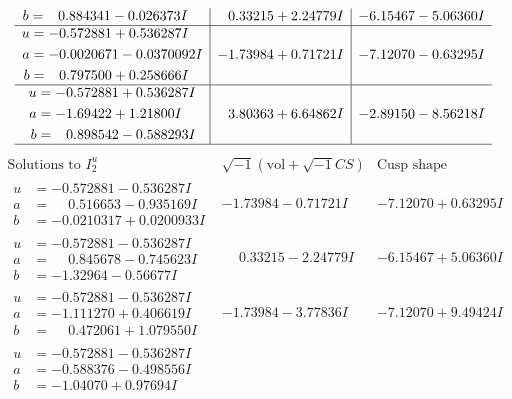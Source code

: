 \documentclass[1p]{elsarticle_modified}
\theoremstyle{definition}
\newcommand{\I}{\sqrt{-1}}
\begin{document}
$$\begin{array}{c|c|c}
\begin{aligned}
b &= \phantom{-}0.884341 - 0.026373 I\end{aligned}
 & \phantom{-}0.33215 + 2.24779 I & -6.15467 - 5.06360 I \\ \hline\begin{aligned}
u &= -0.572881 + 0.536287 I \\
a &= -0.0020671 - 0.0370092 I \\
b &= \phantom{-}0.797500 + 0.258666 I\end{aligned}
 & -1.73984 + 0.71721 I & -7.12070 - 0.63295 I \\ \hline\begin{aligned}
u &= -0.572881 + 0.536287 I \\
a &= -1.69422 + 1.21800 I \\
b &= \phantom{-}0.898542 - 0.588293 I\end{aligned}
 & \phantom{-}3.80363 + 6.64862 I & -2.89150 - 8.56218 I\\
 \hline 
 \end{array}$$\newpage$$\begin{array}{c|c|c}  
\text{Solutions to }I^u_{2}& \I (\text{vol} + \sqrt{-1}CS) & \text{Cusp shape}\\
 \hline 
\begin{aligned}
u &= -0.572881 - 0.536287 I \\
a &= \phantom{-}0.516653 - 0.935169 I \\
b &= -0.0210317 + 0.0200933 I\end{aligned}
 & -1.73984 - 0.71721 I & -7.12070 + 0.63295 I \\ \hline\begin{aligned}
u &= -0.572881 - 0.536287 I \\
a &= \phantom{-}0.845678 - 0.745623 I \\
b &= -1.32964 - 0.56677 I\end{aligned}
 & \phantom{-}0.33215 - 2.24779 I & -6.15467 + 5.06360 I \\ \hline\begin{aligned}
u &= -0.572881 - 0.536287 I \\
a &= -1.111270 + 0.406619 I \\
b &= \phantom{-}0.472061 + 1.079550 I\end{aligned}
 & -1.73984 - 3.77836 I & -7.12070 + 9.49424 I \\ \hline\begin{aligned}
u &= -0.572881 - 0.536287 I \\
a &= -0.588376 - 0.498556 I \\
b &= -1.04070 + 0.97694 I\end{aligned}

\end{array}$$
\end{document}
